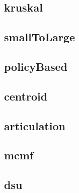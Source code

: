 \vspace{-2pt}
\subsection{kruskal}
\vspace{-5pt}
\raggedbottom
\hrulefill

\vspace{-2pt}
\subsection{smallToLarge}
\vspace{-5pt}
\raggedbottom
\hrulefill

\vspace{-2pt}
\subsection{policyBased}
\vspace{-5pt}
\raggedbottom
\hrulefill

\vspace{-2pt}
\subsection{centroid}
\vspace{-5pt}
\raggedbottom
\hrulefill

\vspace{-2pt}
\subsection{articulation}
\vspace{-5pt}
\raggedbottom
\hrulefill

\vspace{-2pt}
\subsection{mcmf}
\vspace{-5pt}
\raggedbottom
\hrulefill

\vspace{-2pt}
\subsection{dsu}
\vspace{-5pt}
\raggedbottom
\hrulefill

